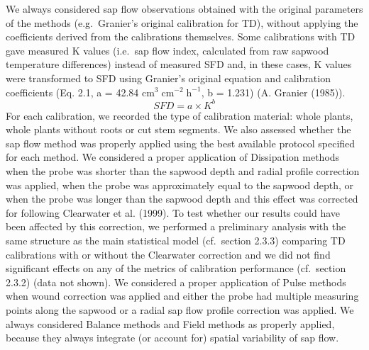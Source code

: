 \documentclass[11pt,twoside]{reedthesis}
\begin{document}
We always considered sap flow observations obtained with the original
parameters of the methods (e.g.~Granier's original calibration for TD),
without applying the coefficients derived from the calibrations
themselves. Some calibrations with TD gave measured K values (i.e.~sap
flow index, calculated from raw sapwood temperature differences) instead
of measured SFD and, in these cases, K values were transformed to SFD
using Granier's original equation and calibration coefficients (Eq. 2.1,
a = 42.84 \(\text{cm}^3\; \text{cm}^{-2}\; \text{h}^{-1}\), b = 1.231)
(A. Granier (1985)).
\begin{equation}
SFD = a\times K^b
\end{equation}
For each calibration, we recorded the type of calibration material:
whole plants, whole plants without roots or cut stem segments. We also
assessed whether the sap flow method was properly applied using the best
available protocol specified for each method. We considered a proper
application of Dissipation methods when the probe was shorter than the
sapwood depth and radial profile correction was applied, when the probe
was approximately equal to the sapwood depth, or when the probe was
longer than the sapwood depth and this effect was corrected for
following Clearwater et al. (1999). To test whether our results could
have been affected by this correction, we performed a preliminary
analysis with the same structure as the main statistical model
(cf.~section 2.3.3) comparing TD calibrations with or without the
Clearwater correction and we did not find significant effects on any of
the metrics of calibration performance (cf.~section 2.3.2) (data not
shown). We considered a proper application of Pulse methods when wound
correction was applied and either the probe had multiple measuring
points along the sapwood or a radial sap flow profile correction was
applied. We always considered Balance methods and Field methods as
properly applied, because they always integrate (or account for) spatial
variability of sap flow.\par
\end{document}
